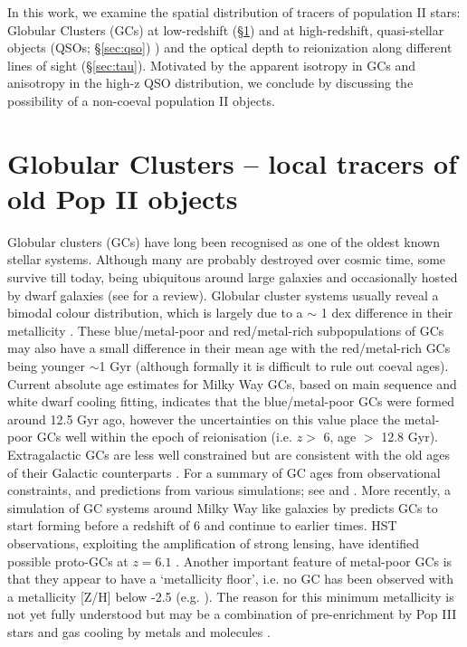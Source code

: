 \documentclass[]{pasa}
\begin{document}
In this work, we examine the spatial distribution of tracers of population II stars: Globular Clusters (GCs) at low-redshift (\S\ref{sec:gc}) and at high-redshift, quasi-stellar objects (QSOs; \S\ref{sec:qso}) ) and the optical depth to reionization along different lines of sight (\S\ref{sec:tau}). 
Motivated by the apparent isotropy in GCs and anisotropy in the high-z QSO distribution, we conclude by discussing the possibility of a non-coeval population II objects. 


\section{Globular Clusters -- local tracers of old Pop II objects}\label{sec:gc}

Globular clusters (GCs) have long been recognised as one of the oldest known stellar systems. Although many are probably destroyed over cosmic time, some survive till today, being ubiquitous around large galaxies and occasionally hosted by dwarf galaxies (see \cite{Brodie2006} for a review). Globular cluster systems usually reveal a bimodal colour distribution, which is largely due to a $\sim$ 1 dex difference in their metallicity \citep{Usher2012}. These blue/metal-poor and red/metal-rich subpopulations of GCs may also have a small difference in their mean age with the red/metal-rich GCs being younger $\sim$1 Gyr  (although formally it is difficult to rule out coeval ages). Current absolute age estimates for Milky Way GCs, based on main sequence and white dwarf cooling fitting, indicates that the blue/metal-poor GCs were formed around 12.5 Gyr ago, however the uncertainties on this value place the metal-poor GCs well within the epoch of reionisation (i.e. $z >$ 6, age $>$ 12.8 Gyr).  Extragalactic GCs are less well constrained but are consistent with the old ages of their Galactic counterparts \citep{Strader2005,Wagner-Kaiser2017}.
For a summary of GC ages from observational constraints, and predictions from various simulations; see \cite{Forbes2015} and \cite{Mould1998}. More recently, a simulation of GC systems around Milky Way like galaxies by \cite{pfeffer2017} predicts GCs to start forming before a redshift of 6 and continue to earlier times. HST observations,  exploiting the amplification of strong lensing, have identified possible proto-GCs at $z = 6.1$ \citep{Vanzella2017}. 
Another important feature of metal-poor GCs is that they appear to have a `metallicity floor', i.e. no GC has been observed with a metallicity [Z/H] below -2.5 (e.g. \citet{Usher2012}). The reason for this minimum metallicity is not yet fully understood but may be a combination of pre-enrichment by Pop III stars \citep{Beasley2003} and gas cooling by metals and molecules \citep{Glover2014}.
\end{document}

